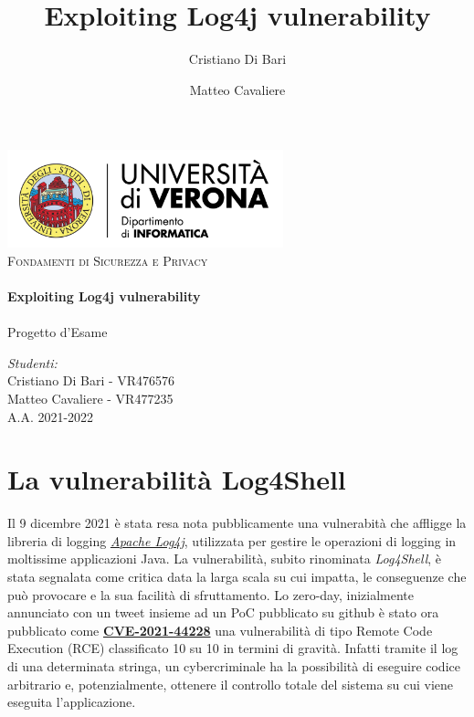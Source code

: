 \documentclass[a4paper, 12pt]{article}
\title{Exploiting Log4j vulnerability}
\author{Cristiano Di Bari}
\author{Matteo Cavaliere}
\begin{document}
\begin{titlepage}
    \vbox{ }

    \begin{center}
        \includegraphics[width=0.60\textwidth]{img/univr-di-logo.png}\\[2cm]
        \textsc{\Large Fondamenti di Sicurezza e Privacy}\\[0.6cm]

        \noindent\makebox[\linewidth]{\rule{.7\paperwidth}{.6pt}}\\[0.7cm]
        { \huge \bfseries Exploiting Log4j vulnerability}\\[0.25cm]
        \noindent\makebox[\linewidth]{\rule{.7\paperwidth}{.6pt}}\\[0.7cm]
        \large{Progetto d'Esame}\\[1.2cm]
        \vfill
        \large
        
        \emph{Studenti:}\\[1mm]
        Cristiano Di Bari  - VR476576  \\[1mm]
        Matteo Cavaliere - VR477235  \\[2cm]

        {\large A.A. 2021-2022}
    \end{center}
\end{titlepage}

\tableofcontents
\newpage

\section{La vulnerabilità Log4Shell}
Il 9 dicembre 2021 è stata resa nota pubblicamente una vulnerabità che affligge la libreria di logging \emph{\href{https://logging.apache.org/log4j/2.x/}{Apache Log4j}}, utilizzata per gestire le operazioni di logging in moltissime applicazioni Java.
La vulnerabilità, subito rinominata \emph{Log4Shell}, è stata segnalata come critica data la larga scala su cui impatta, le conseguenze che può provocare e la sua facilità di sfruttamento.
Lo zero-day, inizialmente annunciato con un tweet insieme ad un PoC pubblicato su github è stato ora pubblicato come \textbf{\href{https://nvd.nist.gov/vuln/detail/CVE-2021-44228}{CVE-2021-44228}}  una vulnerabilità di tipo Remote Code Execution (RCE) classificato 10 su 10 in termini di gravità. Infatti tramite il log di una determinata stringa, un cybercriminale ha la possibilità di eseguire codice arbitrario e, potenzialmente, ottenere il controllo totale del sistema su cui viene eseguita l'applicazione.
\end{document}
